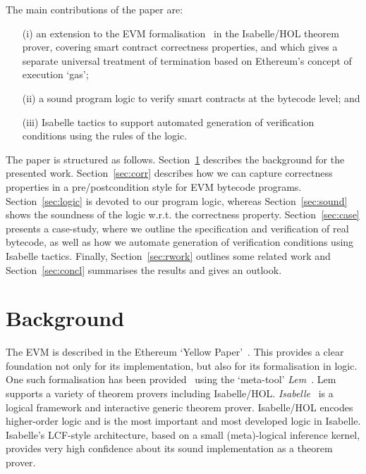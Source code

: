 \documentclass[sigplan,10pt,review]{acmart}\settopmatter{printfolios=true,printccs=false,printacmref=false}
\begin{document}
The main contributions of the paper are:
\begin{itemize}
\item[(i)] an extension to the EVM formalisation~\cite{Yoichi} in the Isabelle/HOL theorem prover,
           covering smart contract correctness properties, and which gives a separate universal
           treatment of termination based on Ethereum's concept of execution `gas';
\item[(ii)] a sound program logic to verify smart contracts at the bytecode level; and
\item[(iii)] Isabelle tactics to support automated generation of verification
            conditions using the rules of the logic.
\end{itemize}
         
The paper is structured as follows. Section~\ref{sec:bg} describes the background
for the presented work. Section~\ref{sec:corr} describes how we can capture correctness properties in a pre/postcondition
style for EVM bytecode programs. Section~\ref{sec:logic} is devoted to our program logic, 
whereas Section~\ref{sec:sound} shows the soundness of the logic
w.r.t. the correctness property.
Section~\ref{sec:case} presents a case-study, where we outline the
specification and verification of real bytecode, as well as how
we automate generation of verification conditions using Isabelle tactics.
Finally, Section~\ref{sec:rwork} outlines some related work and
Section~\ref{sec:concl} summarises the results and gives an outlook.
%
\section{Background} 
\label{sec:bg}
The EVM is described in the Ethereum `Yellow Paper'~\cite{wood2014ethereum}.
This provides a clear foundation not only for its implementation, but also for its formalisation in logic.
One such formalisation has been provided~\cite{Yoichi} using the `meta-tool' \emph{Lem}~\cite{DBLP:conf/icfp/MulliganOGRS14}.
Lem supports a variety of theorem provers including Isabelle/HOL.
\emph{Isabelle}~\cite{Nipkow_PW:Isabelle} is a logical framework and interactive generic theorem prover.
Isabelle/HOL encodes higher-order logic and is the most important and most developed logic in Isabelle.
Isabelle's LCF-style architecture,
based on a small (meta)-logical inference kernel, provides very high confidence about its sound
implementation as a theorem prover.
 
\end{document}
